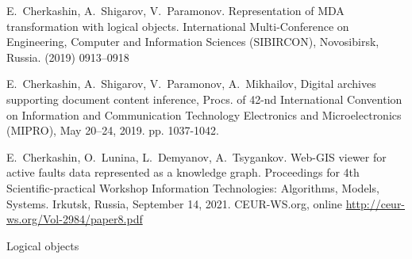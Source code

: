 \documentclass[
]{ceurart}
\begin{document}
\begin{thebibliography}{99}
 E.~Cherkashin, A.~Shigarov, V.~Paramonov. Representation of MDA transformation with logical objects. International Multi-Conference on Engineering, Computer and Information Sciences (SIBIRCON), Novosibirsk, Russia. (2019) 0913--0918 

 E.~Cherkashin, A.~Shigarov, V.~Paramonov, A.~Mikhailov, Digital archives supporting document content inference, Procs. of 42-nd International Convention on Information and Communication Technology Electronics and Microelectronics (MIPRO), May 20–24, 2019. pp. 1037-1042. 

 E.~Cherkashin, O.~Lunina, L.~Demyanov, A.~Tsygankov. Web-GIS viewer for active faults data represented as a knowledge graph. Proceedings for 4th Scientific-practical Workshop Information Technologies: Algorithms, Models, Systems. Irkutsk, Russia, September 14, 2021. CEUR-WS.org, online \url{http://ceur-ws.org/Vol-2984/paper8.pdf}

 Logical objects

\end{thebibliography}

\end{document}
